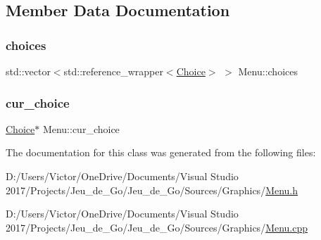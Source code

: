 \subsection{Member Data Documentation}
\mbox{\label{class_menu_aa40e2b74e7bdeee960889e083eca15d2}} 
\subsubsection{\texorpdfstring{choices}{choices}}
{\footnotesize\ttfamily std\+::vector$<$std\+::reference\+\_\+wrapper$<$\hyperlink{class_choice}{Choice}$>$ $>$ Menu\+::choices\hspace{0.3cm}{\ttfamily [protected]}}

\mbox{\label{class_menu_a91fc2547256d492def0845bd1ebcfaf8}} 
\subsubsection{\texorpdfstring{cur\+\_\+choice}{cur\_choice}}
{\footnotesize\ttfamily \hyperlink{class_choice}{Choice}$\ast$ Menu\+::cur\+\_\+choice\hspace{0.3cm}{\ttfamily [protected]}}



The documentation for this class was generated from the following files\+:\begin{DoxyCompactItemize}
\item 
D\+:/\+Users/\+Victor/\+One\+Drive/\+Documents/\+Visual Studio 2017/\+Projects/\+Jeu\+\_\+de\+\_\+\+Go/\+Jeu\+\_\+de\+\_\+\+Go/\+Sources/\+Graphics/\hyperlink{_menu_8h}{Menu.\+h}\item 
D\+:/\+Users/\+Victor/\+One\+Drive/\+Documents/\+Visual Studio 2017/\+Projects/\+Jeu\+\_\+de\+\_\+\+Go/\+Jeu\+\_\+de\+\_\+\+Go/\+Sources/\+Graphics/\hyperlink{_menu_8cpp}{Menu.\+cpp}\end{DoxyCompactItemize}
